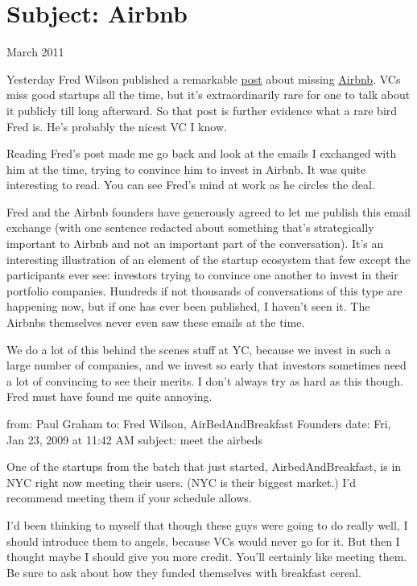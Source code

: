 \chapter{Subject: Airbnb}



March 2011

Yesterday Fred Wilson published a remarkable \href{http://avc.com/2011/03/airbnb}{post} about missing
\href{http://airbnb.com}{Airbnb}.   VCs miss good startups all the time, but it's extraordinarily
rare for one to talk about it publicly till long afterward.  So
that post is further evidence what a rare bird Fred is.  He's
probably the nicest VC I know.

Reading Fred's post made me go back and look at the emails I exchanged
with him at the time, trying to convince him to invest in Airbnb.
It was quite interesting to read.  You can see Fred's mind at work 
as he circles the deal.

Fred and the Airbnb founders have generously agreed to let me publish
this email exchange (with one sentence redacted about something
that's strategically important to Airbnb and not an important part
of the conversation).  It's an interesting illustration of an element
of the startup ecosystem that few except the participants ever see:
investors trying to convince one another to invest in their portfolio
companies.  Hundreds if not thousands of conversations of this type
are happening now, but if one has ever been published, I haven't
seen it.  The Airbnbs themselves never even saw these emails at the
time.

We do a lot of this behind the scenes stuff at YC, because we invest
in such a large number of companies, and we invest so early that
investors sometimes need a lot of convincing to see their merits.
I don't always try as hard as this though.  Fred must 
have found me quite annoying.




from: Paul Graham
to: Fred Wilson, AirBedAndBreakfast Founders
date: Fri, Jan 23, 2009 at 11:42 AM
subject: meet the airbeds

One of the startups from the batch that just started, AirbedAndBreakfast,
is in NYC right now meeting their users.  (NYC is their biggest
market.) I'd recommend meeting them if your schedule allows.

I'd been thinking to myself that though these guys were going to
do really well, I should introduce them to angels, because VCs would
never go for it.  But then I thought maybe I should give you more
credit.  You'll certainly like meeting them.  Be sure to ask about
how they funded themselves with breakfast cereal.

